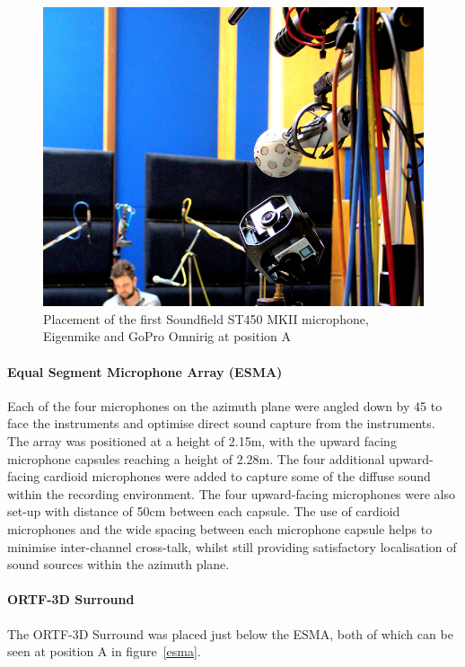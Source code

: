 			\begin{figure}[ht]
			\begin{center}
				\includegraphics[width = \linewidth]{images/other/ST450pos.png}
				\caption{Placement of the first Soundfield ST450 MKII microphone, Eigenmike and GoPro Omnirig at position A}
				\label{STApos}
			\end{center}
			\end{figure}

			\paragraph{Equal Segment Microphone Array (ESMA)}
			Each of the four microphones on the azimuth plane were angled down by 45\textdegree{} to face the instruments and optimise direct sound capture from the instruments. The array was positioned at a height of 2.15m, with the upward facing microphone capsules reaching a height of 2.28m. The four additional upward-facing cardioid microphones were added to capture some of the diffuse sound within the recording environment. The four upward-facing microphones were also set-up with distance of 50cm between each capsule. The use of cardioid microphones and the wide spacing between each microphone capsule helps to minimise inter-channel cross-talk, whilst still providing satisfactory localisation of sound sources within the azimuth plane.\\


			\paragraph{ORTF-3D Surround}
			The ORTF-3D Surround was placed just below the ESMA, both of which can be seen at position A in figure~\ref{esma}.\\


